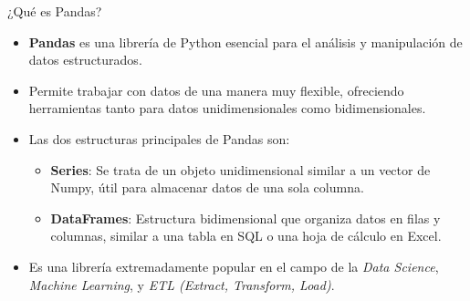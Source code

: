 \documentclass[spanish]{beamer}
\begin{document}
\begin{frame}{¿Qué es Pandas?}
    \begin{itemize}
        \item \textbf{Pandas} es una librería de Python esencial para el análisis y manipulación de datos estructurados.
        \item Permite trabajar con datos de una manera muy flexible, ofreciendo herramientas tanto para datos unidimensionales como bidimensionales.
        \item Las dos estructuras principales de Pandas son:
        \begin{itemize}
            \item \textbf{Series}: Se trata de un objeto unidimensional similar a un vector de Numpy, útil para almacenar datos de una sola columna.
            \item \textbf{DataFrames}: Estructura bidimensional que organiza datos en filas y columnas, similar a una tabla en SQL o una hoja de cálculo en Excel.
        \end{itemize}
        \item Es una librería extremadamente popular en el campo de la \textit{Data Science}, \textit{Machine Learning}, y \textit{ETL (Extract, Transform, Load)}.
    \end{itemize}
\end{frame}
\end{document}
